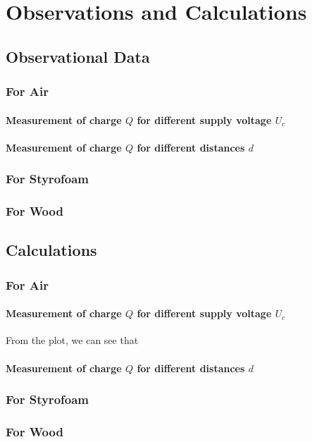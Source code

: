\section{Observations and Calculations}

\subsection*{Observational Data}

    \subsubsection{For Air}

        \paragraph*{Measurement of charge $Q$ for different supply voltage $U_c$}


        \paragraph*{Measurement of charge $Q$ for different distances $d$}

    \subsubsection{For Styrofoam}

    \subsubsection{For Wood}


\subsection*{Calculations}

    \subsubsection{For Air}

        \paragraph*{Measurement of charge $Q$ for different supply voltage $U_c$}

            From the plot, we can see that

        \paragraph*{Measurement of charge $Q$ for different distances $d$}

    \subsubsection{For Styrofoam}

    \subsubsection{For Wood}
        
